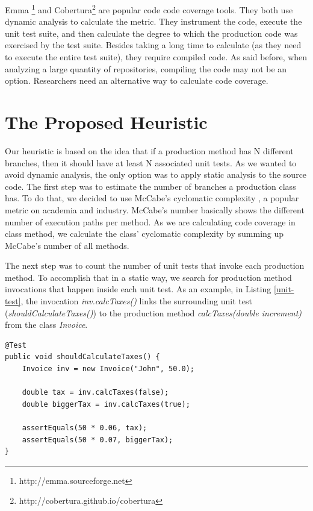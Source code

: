 \documentclass{sig-alternate}
\begin{document}
Emma \footnote{http://emma.sourceforge.net} and Cobertura\footnote{http://cobertura.github.io/cobertura} are popular 
code code coverage tools. They both use dynamic analysis to calculate the metric. They instrument the code, execute 
the unit test suite, and then calculate the degree to which the production code was exercised by the test suite. Besides 
taking a long time to calculate (as they need to execute the entire test suite),
they require compiled code. As said before, when analyzing a large quantity of repositories,
compiling the code may not be an option. Researchers need an alternative way to calculate code coverage.

\section{The Proposed Heuristic}
\label{sec-heuristic}

Our heuristic is based on the idea that if a production method has N different branches, then it should
have at least N associated unit tests. As we wanted to avoid dynamic analysis, the only option was 
to apply static analysis to the source code. The first step was to estimate the number of branches 
a production class has. To do that, we decided to use McCabe's cyclomatic complexity \cite{mccabe}, a popular
metric on academia and industry.
McCabe's number basically shows the different number of execution paths per method. 
As we are calculating code coverage in class method, we calculate the class' cyclomatic complexity
by summing up McCabe's number of all methods.

The next step was to count the number of unit tests that invoke each production method. To accomplish that
in a static way, we search for production method invocations that happen inside each unit test. As an example, in Listing
\ref{unit-test}, the invocation \textit{inv.calcTaxes()} links the surrounding unit test (\textit{shouldCalculateTaxes()}) to 
the production method \textit{calcTaxes(double increment)} from the class \textit{Invoice}.

\begin{lstlisting}
@Test
public void shouldCalculateTaxes() {
	Invoice inv = new Invoice("John", 50.0);

	double tax = inv.calcTaxes(false);
	double biggerTax = inv.calcTaxes(true);
		
	assertEquals(50 * 0.06, tax);
	assertEquals(50 * 0.07, biggerTax);
}
\end{lstlisting}
\end{document}

